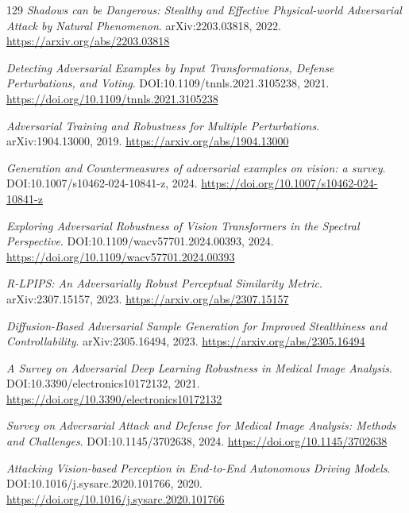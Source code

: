 \documentclass[11pt,a4paper]{article}
\begin{document}
\begin{thebibliography}{129}
\newblock \emph{Shadows can be Dangerous: Stealthy and Effective Physical-world Adversarial Attack by Natural Phenomenon}.
\newblock arXiv:2203.03818, 2022.
\newblock \url{https://arxiv.org/abs/2203.03818}

\newblock \emph{Detecting Adversarial Examples by Input Transformations, Defense Perturbations, and Voting}.
\newblock DOI:10.1109/tnnls.2021.3105238, 2021.
\newblock \url{https://doi.org/10.1109/tnnls.2021.3105238}

\newblock \emph{Adversarial Training and Robustness for Multiple Perturbations}.
\newblock arXiv:1904.13000, 2019.
\newblock \url{https://arxiv.org/abs/1904.13000}

\newblock \emph{Generation and Countermeasures of adversarial examples on vision: a survey}.
\newblock DOI:10.1007/s10462-024-10841-z, 2024.
\newblock \url{https://doi.org/10.1007/s10462-024-10841-z}

\newblock \emph{Exploring Adversarial Robustness of Vision Transformers in the Spectral Perspective}.
\newblock DOI:10.1109/wacv57701.2024.00393, 2024.
\newblock \url{https://doi.org/10.1109/wacv57701.2024.00393}

\newblock \emph{R-LPIPS: An Adversarially Robust Perceptual Similarity Metric}.
\newblock arXiv:2307.15157, 2023.
\newblock \url{https://arxiv.org/abs/2307.15157}

\newblock \emph{Diffusion-Based Adversarial Sample Generation for Improved Stealthiness and Controllability}.
\newblock arXiv:2305.16494, 2023.
\newblock \url{https://arxiv.org/abs/2305.16494}

\newblock \emph{A Survey on Adversarial Deep Learning Robustness in Medical Image Analysis}.
\newblock DOI:10.3390/electronics10172132, 2021.
\newblock \url{https://doi.org/10.3390/electronics10172132}

\newblock \emph{Survey on Adversarial Attack and Defense for Medical Image Analysis: Methods and Challenges}.
\newblock DOI:10.1145/3702638, 2024.
\newblock \url{https://doi.org/10.1145/3702638}

\newblock \emph{Attacking Vision-based Perception in End-to-End Autonomous Driving Models}.
\newblock DOI:10.1016/j.sysarc.2020.101766, 2020.
\newblock \url{https://doi.org/10.1016/j.sysarc.2020.101766}


\end{thebibliography}
\end{document}
